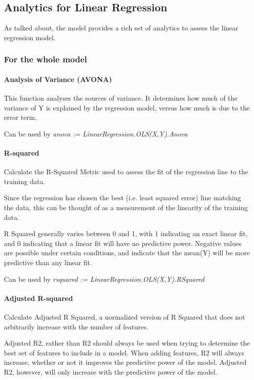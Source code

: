 \subsection{Analytics for Linear Regression}

As talked about, the model provides a rich set of analytics to assess the linear regression model. 

\subsubsection{For the whole model}

\paragraph{Analysis of Variance (AVONA)}

This function analyses the sources of variance. It determines how much of the variance of Y is explained by the regression model, versus how much is due to the error term.

Can be used by \textit{anova := LinearRegression.OLS(X,Y).Anova}

\paragraph{R-squared}

Calculate the R-Squared Metric used to assess the fit of the regression line to the training data.

Since the regression has chosen the best (i.e. least squared error) line matching the data, this can be thought of as a measurement of the linearity of the training data.

R Squared generally varies between 0 and 1, with 1 indicating an exact linear fit, and 0 indicating that a linear fit will have no predictive power. Negative values are possible under certain conditions, and indicate that the mean(Y) will be more predictive than any linear fit.

Can be used by \textit{rsquared := LinearRegression.OLS(X,Y).RSquared}

\paragraph{Adjusted R-squared}

Calculate Adjusted R Squared, a normalized version of R Squared that does not arbitrarily increase with the number of features.

Adjusted R2, rather than R2 should always be used when trying to determine the best set of features to include in a model. When adding features, R2 will always increase, whether or not it improves the predictive power of the model. Adjusted R2, however, will only increase with the predictive power of the model.

